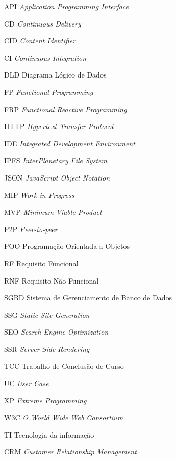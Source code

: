 \begin{siglas}
  \item[API] \textit{Application Programming Interface}
  \item[CD] \textit{Continuous Delivery}
  \item[CID] \textit{Content Identifier}
  \item[CI] \textit{Continuous Integration}
  \item[DLD] Diagrama Lógico de Dados
  \item[FP] \textit{Functional Programming} 
  \item[FRP] \textit{Functional Reactive Programming}
  \item[HTTP] \textit{Hypertext Transfer Protocol}
  \item[IDE] \textit{Integrated Development Environment}
  \item[IPFS] \textit{InterPlanetary File System}
  \item[JSON] \textit{JavaScript Object Notation}
  \item[MIP] \textit{Work in Progress}
  \item[MVP] \textit{Minimum Viable Product}
  \item[P2P] \textit{Peer-to-peer}
  \item[POO] Programação Orientada a Objetos
  \item[RF] Requisito Funcional
  \item[RNF] Requisito Não Funcional
  \item[SGBD] Sistema de Gerenciamento de Banco de Dados
  \item[SSG] \textit{Static Site Generation}
  \item[SEO] \textit{Search Engine Optimization}
  \item[SSR] \textit{Server-Side Rendering}
  \item[TCC] Trabalho de Conclusão de Curso
  \item[UC] \textit{User Case}
  \item[XP] \textit{Extreme Programming}
  \item[W3C] \textit{O World Wide Web Consortium}
  \item[TI] Tecnologia da informação
  \item[CRM] \textit{Customer Relationship Management}
\end{siglas}
